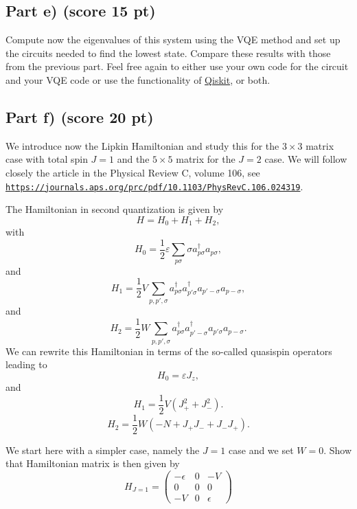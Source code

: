 \documentclass[%
oneside,                 %
final,                   %
10pt]{article}
\begin{document}
\subsection{Part e) (score 15 pt)}

Compute now the eigenvalues of this system using the VQE method and
set up the circuits needed to find the lowest state. Compare these
results with those from the previous part. Feel free again to either
use your own code for the circuit and your VQE code or use the
functionality of \href{{https://qiskit.org/}}{Qiskit}, or both.

\subsection{Part f) (score 20 pt)}

We introduce now the Lipkin Hamiltonian and study this for the
$3\times 3$ matrix case with total spin $J=1$ and the $5\times 5$
matrix for the $J=2$ case.
We will follow closely the article in the Physical Review C, volume 106, see \href{{https://journals.aps.org/prc/pdf/10.1103/PhysRevC.106.024319}}{\nolinkurl{https://journals.aps.org/prc/pdf/10.1103/PhysRevC.106.024319}}.

The Hamiltonian in second quantization is given by
\[
H = H_0 + H_1 +H_2,
\]
with 
\[
H_0 = \frac{1}{2} \varepsilon \sum_{p\sigma}\sigma a_{p\sigma}^{\dagger}a_{p\sigma},
\]
and
\[
H_1 = \frac{1}{2} V \sum_{p,p',\sigma} a_{p\sigma}^\dagger a_{p'\sigma}^\dagger a_{p'-\sigma} a_{p-\sigma},
\]
and
\[
H_{2} = \frac{1}{2} W \sum_{p,p',\sigma}a_{p\sigma}^\dagger a_{p'-\sigma}^\dagger a_{p'\sigma}a_{p-\sigma}.
\]
We can rewrite this Hamiltonian in terms of the so-called quasispin operators leading to
\begin{equation}
H_0 = \varepsilon J_z,
\end{equation}
and
\begin{equation}
H_1 = \frac{1}{2} V \left( J_+^2 + J_-^2 \right).
\end{equation}
\begin{equation}
H_2 = \frac{1}{2} W \left( -N + J_+ J_- + J_- J_+ \right).
\end{equation}

We start here with a simpler case, namely the $J=1$ case and we set $W=0$. Show that Hamiltonian matrix is then given by
\begin{equation}
H_{J = 1} =
\begin{pmatrix}-\epsilon & 0 & -V\\
 0&0&0\\
 -V&0&\epsilon
\end{pmatrix}
\end{equation}
\end{document}

